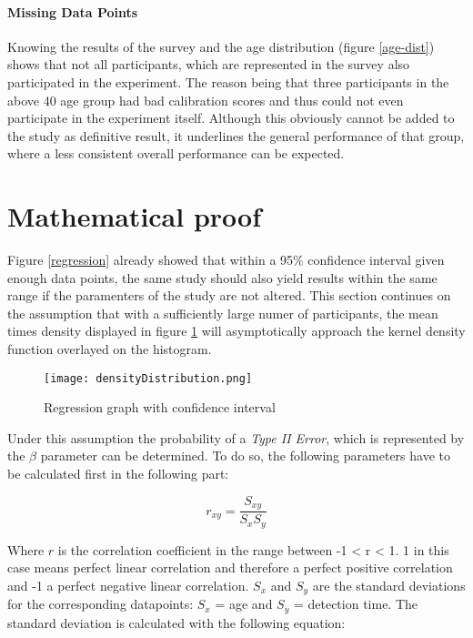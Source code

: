             
            \paragraph{Missing Data Points} Knowing the results of the survey and the age distribution (figure \ref*{age-dist}) shows that not all participants, which are represented in the survey also participated in the experiment. The reason being that three participants in the above 40 age group had bad calibration scores and thus could not even participate in the experiment itself. Although this obviously cannot be added to the study as definitive result, it underlines the general performance of that group, where a less consistent overall performance can be expected.

        \section{Mathematical proof}\label{mafs}

            Figure \ref*{regression} already showed that within a 95\% confidence interval given enough data points, the same study should also yield results within the same range if the paramenters of the study are not altered. This section continues on the assumption that with a sufficiently large numer of participants, the mean times density displayed in figure \ref*{means-density} will asymptotically approach the kernel density function overlayed on the histogram. 

            \begin{figure}[h]     %
                \centering
                \texttt{[image: densityDistribution.png]}
                \caption{Regression graph with confidence interval}\label{means-density}
            \end{figure}

            Under this assumption the probability of a \textit{Type II Error}, which is represented by the $\beta$ parameter can be determined. To do so, the following parameters have to be calculated first in the following part:

            \begin{equation}\label{r-formula}
                r_{xy} = \frac{S_{xy}}{S_{x}S_{y}}
            \end{equation}

            Where $r$ is the correlation coefficient in the range between -1 < r < 1. 1 in this case means perfect linear correlation and therefore a perfect positive correlation and -1 a perfect negative linear correlation. $S_{x}$ and $S_{y}$ are the standard deviations for the corresponding datapoints: $S_{x}$ = age and $S_{y}$ = detection time. 
            The standard deviation is calculated with the following equation:

